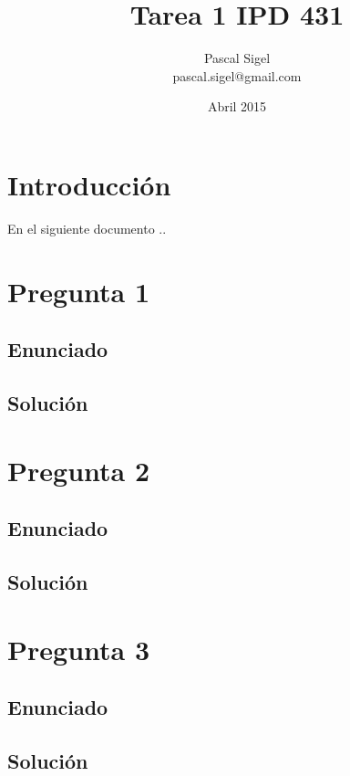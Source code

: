 \documentclass[11pt,twoside,letterpaper]{article}
\begin{document}
	\title{Tarea 1 IPD 431}
	\author{Pascal Sigel\\pascal.sigel@gmail.com}
	\date{Abril 2015}
	\maketitle
	\newpage
	
	\section{Introducción}
	En el siguiente documento ..
	

	\section{ Pregunta 1 }

	\subsection{ Enunciado }

	\subsection{ Solución }

	\section{ Pregunta 2 }

	\subsection{ Enunciado }

	\subsection{ Solución }

	\section{ Pregunta 3 }

	\subsection{ Enunciado }

	\subsection{ Solución }
\end{document}
